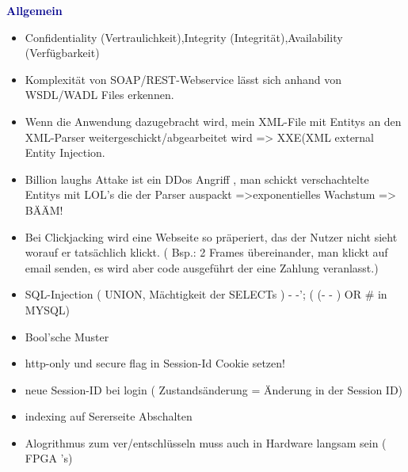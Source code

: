 \textbf{\textcolor{darkblue}{ Allgemein}}~
	\begin{itemize}
		
	\item Confidentiality (Vertraulichkeit),Integrity (Integrität),Availability (Verfügbarkeit)
	\item Komplexität von SOAP/REST-Webservice lässt sich anhand von WSDL/WADL Files erkennen.
	\item Wenn die Anwendung dazugebracht wird, mein XML-File mit Entitys an den XML-Parser weitergeschickt/abgearbeitet wird => XXE(XML external Entity Injection.
	\item Billion laughs Attake ist ein DDos Angriff , man schickt verschachtelte Entitys mit LOL's die der Parser auspackt  =>exponentielles Wachstum => BÄÄM!
	\item Bei Clickjacking wird eine Webseite so präperiert, das der Nutzer nicht sieht worauf er tatsächlich klickt. ( Bsp.: 2 Frames übereinander, man klickt auf email senden, es wird aber code ausgeführt der eine Zahlung veranlasst.)
	\item SQL-Injection ( UNION, Mächtigkeit der SELECTs ) - -'; ( (- - ) OR \# in MYSQL)
	\item Bool'sche Muster
	\item http-only und secure flag in Session-Id Cookie setzen!
	\item  neue Session-ID bei login ( Zustandsänderung = Änderung in der Session ID)
	\item  indexing auf Sererseite Abschalten
	\item Alogrithmus zum ver/entschlüsseln muss auch in Hardware langsam sein ( FPGA\'{ '}s)
	
	\end{itemize}














